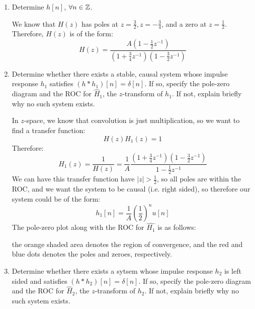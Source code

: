 \documentclass[10pt]{article}
\begin{document}
	\begin{enumerate}[label=\alph*)]
		\item Determine  \( h[n] \), \( \forall n \in \mathbb Z \). 

			\begin{solution}
				We know that \( H(z) \) has poles at \( z = \frac{3}{2}, z = -\frac{3}{4} \), and a zero 
				at \( z = \frac{1}{2} \). Therefore, \( H(z) \) is of the form:
				\[
				H(z) = \frac{A(1 - \frac{1}{2}z^{-1})}{(1 + \frac{3}{4}z^{-1})(1 - \frac{3}{2}z^{-1})}
				\] 
			\end{solution}
		\item Determine whether there exists a stable, causal system whose impulse response \( h_1 \) satisfies 
			\( (h * h_1)[n] = \delta[n] \). If so, specify the pole-zero diagram and the ROC for \( \hat{H}_1 \), 
			the \( z \)-transform of \( h_1 \). If not, explain briefly why no such system exists. 

			\begin{solution}
				In \( z \)-space, we know that convolution is just multiplication, so we want to find a 
				transfer function:
				\[
				H(z) H_1(z) = 1
				\] 
				Therefore:
				\[
				H_1(z) = \frac{1}{H(z)} = 
				\frac{1}{A}\frac{(1 + \frac{3}{4}z^{-1})(1 - \frac{3}{2}z^{-1})}{1 - \frac{1}{2}z^{-1}}
				\] 
				We can have this transfer function have \( |z| > \frac{1}{2} \), so all poles are within the 
				ROC, and we want the system to be causal (i.e. right sided), so therefore our system 
				could be of the form:
				\[
					h_1[n] = \frac{1}{A}\left( \frac{1}{2} \right)^{n}u[n]
				\] 
				The pole-zero plot along with the ROC for \( \hat{H_1} \) is as follows:
				\begin{center}
				\end{center}
				the orange shaded area denotes the region of convergence, and the red and blue dots denotes 
				the poles and zeroes, respectively.
			\end{solution}
		\item Determine whether there exists a sytsem whose impulse response \( h_2 \) is left sided and 
			satisfies \( (h * h_2)[n] = \delta[n] \). If so, specify the pole-zero diagram and the ROC for 
			\( \hat{H}_2 \), the \( z \)-transform of \( h_2 \). If not, explain briefly why no such system exists. 


\end{enumerate}
\end{document}
